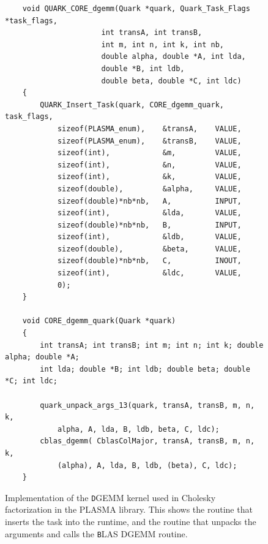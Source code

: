 \documentclass[11pt,letterpaper]{report}
\begin{document}
\begin{figure}[pbt]
\centering
\scriptsize
\begin{lstlisting}
    void QUARK_CORE_dgemm(Quark *quark, Quark_Task_Flags *task_flags,
                      int transA, int transB,
                      int m, int n, int k, int nb,
                      double alpha, double *A, int lda,
                      double *B, int ldb,
                      double beta, double *C, int ldc)
    {
        QUARK_Insert_Task(quark, CORE_dgemm_quark, task_flags,
            sizeof(PLASMA_enum),    &transA,    VALUE,
            sizeof(PLASMA_enum),    &transB,    VALUE,
            sizeof(int),            &m,         VALUE,
            sizeof(int),            &n,         VALUE,
            sizeof(int),            &k,         VALUE,
            sizeof(double),         &alpha,     VALUE,
            sizeof(double)*nb*nb,   A,          INPUT,
            sizeof(int),            &lda,       VALUE,
            sizeof(double)*nb*nb,   B,          INPUT,
            sizeof(int),            &ldb,       VALUE,
            sizeof(double),         &beta,      VALUE,
            sizeof(double)*nb*nb,   C,          INOUT,
            sizeof(int),            &ldc,       VALUE,
            0);
    }

    void CORE_dgemm_quark(Quark *quark)
    {
        int transA; int transB; int m; int n; int k; double alpha; double *A;
        int lda; double *B; int ldb; double beta; double *C; int ldc;

        quark_unpack_args_13(quark, transA, transB, m, n, k,
            alpha, A, lda, B, ldb, beta, C, ldc);
        cblas_dgemm( CblasColMajor, transA, transB, m, n, k,
            (alpha), A, lda, B, ldb, (beta), C, ldc);
    }
\end{lstlisting}
\caption{ Implementation of the {\texttt DGEMM} kernel used in
  Cholesky factorization in the PLASMA library.  This shows the
  routine that inserts the task into the runtime, and the routine that
  unpacks the arguments and calls the {\texttt BLAS DGEMM} routine. }
\label{fig:quark_core_dgemm}
\end{figure}








\end{document}
